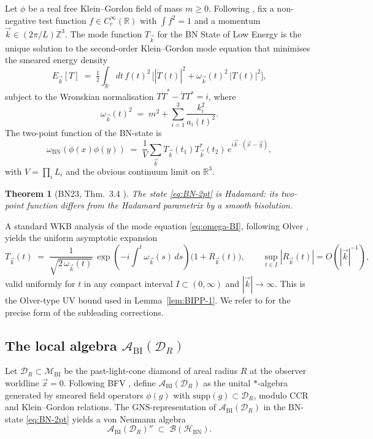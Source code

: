 \documentclass[11pt,a4paper]{article}
\newtheorem{theorem}{Theorem}[section]
\theoremstyle{definition}
\newcommand{\R}{\mathbb{R}}
\newcommand{\Z}{\mathbb{Z}}
\newcommand{\cA}{\mathcal{A}}
\newcommand{\cH}{\mathcal{H}}
\newcommand{\cM}{\mathcal{M}}
\newcommand{\cD}{\mathcal{D}}
\newcommand{\BI}{\mathrm{BI}}
\newcommand{\BN}{\mathrm{BN}}
\begin{document}
Let $\phi$ be a real free Klein--Gordon field of mass $m\geq 0$. Following
\cite[\S 3]{BN23}, fix a non-negative test function $f \in C_c^\infty(\R)$
with $\int f^2 = 1$ and a momentum $\vec k \in (2\pi/L)\Z^3$. The mode
function $T_{\vec k}$ for the BN State of Low Energy is the unique
solution to the second-order Klein--Gordon mode equation that minimises
the smeared energy density
\begin{equation}\label{eq:BN-min}
E_{\vec k}[T] \;=\; \tfrac12\int_\R dt\, f(t)^2\,
\Big[ |\dot T(t)|^2 + \omega_{\vec k}(t)^2\,|T(t)|^2 \Big],
\end{equation}
subject to the Wronskian normalisation $T\dot T^*-\dot T T^*=i$, where
\begin{equation}\label{eq:omega-BI}
\omega_{\vec k}(t)^2 \;=\; m^2 + \sum_{i=1}^3 \frac{k_i^2}{a_i(t)^2}.
\end{equation}
The two-point function of the BN-state is
\begin{equation}\label{eq:BN-2pt}
\omega_\BN(\phi(x)\phi(y)) \;=\; \frac{1}{V}\sum_{\vec k}
T_{\vec k}(t_1) T_{\vec k}^*(t_2)\, e^{i\vec k\cdot(\vec x-\vec y)},
\end{equation}
with $V = \prod_i L_i$ and the obvious continuum limit on $\R^3$.

\begin{theorem}[BN23, Thm.~3.4 \cite{BN23}]\label{thm:BN-Hadamard}
The state \eqref{eq:BN-2pt} is Hadamard: its two-point function differs
from the Hadamard parametrix by a smooth bisolution.
\end{theorem}

A standard WKB analysis of the mode equation \eqref{eq:omega-BI},
following Olver \cite{Olver1974}, yields the uniform asymptotic
expansion
\begin{equation}\label{eq:Olver-WKB}
T_{\vec k}(t) \;=\; \frac{1}{\sqrt{2\,\omega_{\vec k}(t)}}\,
\exp\!\left(-i\int^t \omega_{\vec k}(s)\,ds\right)
\big(1 + R_{\vec k}(t)\big),\qquad
\sup_{t \in I}|R_{\vec k}(t)| = O(|\vec k|^{-1}),
\end{equation}
valid uniformly for $t$ in any compact interval $I\subset (0,\infty)$
and $|\vec k|\to\infty$. This is the Olver-type UV bound used in
Lemma~\ref{lem:BIPP-1}. We refer to \cite[\S 3.4]{BN23} for the precise
form of the subleading corrections.

\subsection{The local algebra $\cA_\BI(\cD_R)$}
Let $\cD_R\subset\cM_\BI$ be the past-light-cone diamond of areal
radius $R$ at the observer worldline $\vec x = 0$. Following BFV
\cite{BFV03}, define $\cA_\BI(\cD_R)$ as the unital $*$-algebra
generated by smeared field operators $\phi(g)$ with $\mathrm{supp}(g)
\subset \cD_R$, modulo CCR and Klein--Gordon relations. The
GNS-representation of $\cA_\BI(\cD_R)$ in the BN-state \eqref{eq:BN-2pt}
yields a von Neumann algebra
\begin{equation}
\cA_\BI(\cD_R)'' \;\subset\; \mathcal{B}(\cH_\BN).
\end{equation}
\end{document}

